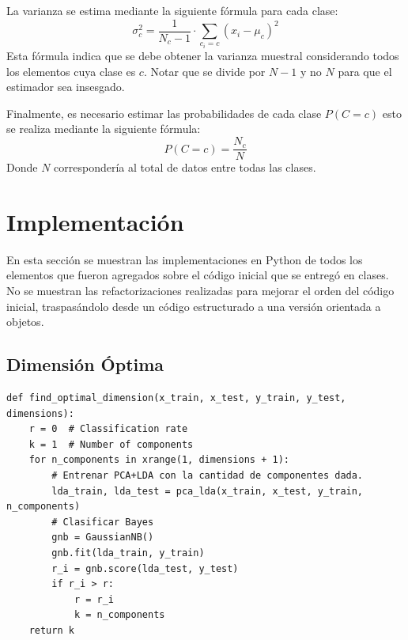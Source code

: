 \documentclass[letter, titlepage, 10pt]{article}
\begin{document}
La varianza se estima mediante la siguiente fórmula para cada clase:
\begin{equation}
\sigma_c^2 = \frac{1}{N_c-1}\cdot \sum\limits_{c_i = c}{(x_i-\mu_c)^2}
\end{equation}
Esta fórmula indica que se debe obtener la varianza muestral considerando todos los elementos cuya clase es $c$. Notar que se divide por $N-1$ y no $N$ para que el estimador sea insesgado.

Finalmente, es necesario estimar las probabilidades de cada clase $P(C = c)$ esto se realiza mediante la siguiente fórmula:
\begin{equation}
P(C = c) = \frac{N_c}{N}
\end{equation}
Donde $N$ correspondería al total de datos entre todas las clases.


\newpage

\section{Implementación}

En esta sección se muestran las implementaciones en Python de todos los elementos que fueron agregados sobre el código inicial que se entregó en clases. No se muestran las refactorizaciones realizadas para mejorar el orden del código inicial, traspasándolo desde un código estructurado a una versión orientada a objetos. 

\subsection{Dimensión Óptima}
\begin{lstlisting}
def find_optimal_dimension(x_train, x_test, y_train, y_test, dimensions):
    r = 0  # Classification rate
    k = 1  # Number of components
    for n_components in xrange(1, dimensions + 1):
        # Entrenar PCA+LDA con la cantidad de componentes dada.
        lda_train, lda_test = pca_lda(x_train, x_test, y_train, n_components)
        # Clasificar Bayes
        gnb = GaussianNB()
        gnb.fit(lda_train, y_train)
        r_i = gnb.score(lda_test, y_test)
        if r_i > r:
            r = r_i
            k = n_components
    return k
\end{lstlisting}
\end{document}
